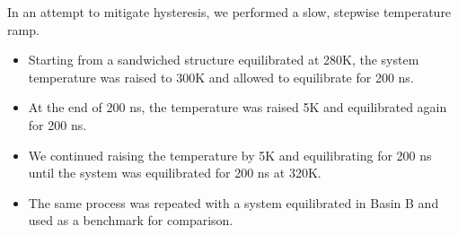 \documentclass{article}
\begin{document}
  In an attempt to mitigate hysteresis, we performed a slow, stepwise temperature ramp.
  \begin{itemize}
        \item Starting from a sandwiched structure equilibrated at 280K, the system
        temperature was raised to 300K and allowed to equilibrate for 200 ns.
        \item At the end of 200 ns, the temperature was raised 5K and equilibrated
        again for 200 ns.
        \item We continued raising the temperature by 5K and equilibrating for 200 ns
        until the system was equilibrated for 200 ns at 320K.
	\item The same process was repeated with a system equilibrated in Basin B and used
	as a benchmark for comparison. 
  \end{itemize}
\end{document}
